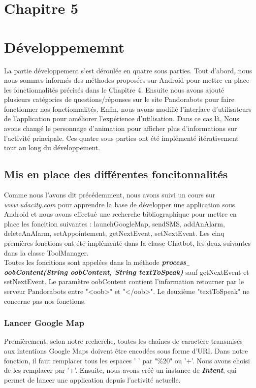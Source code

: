 \section*{Chapitre 5}
\section{Développememnt}
	La partie développement s'est déroulée en quatre sous parties. Tout d'abord, nous nous sommes informés des méthodes proposées sur Android pour mettre en place les fonctionnalités précisés dans le Chapitre 4. Ensuite nous avons ajouté plusieurs catégories de questions/réponses sur le site Pandorabots pour faire fonctionner nos fonctionnalités. Enfin, nous avons modifié l'interface d'utilisateurs de l'application pour améliorer l'expérience d'utilisation. Dans ce cas là, Nous avons changé le personnage d'animation pour afficher plus d'informations sur l'activité principale. Ces quatre sous parties ont été implémenté itérativement tout au long du développement.

\subsection{Mis en place des différentes foncitonnalités}
	
\indent Comme nous l'avons dit précédemment, nous avons suivi un cours sur \emph{www.udacity.com} pour apprendre la base de développer une application sous Android et nous avons effectué une recherche bibliographique pour mettre en place les foncition suivantes : launchGoogleMap, sendSMS, addAnAlarm, deleteAnAlarm, setAppointement, getNextEvent, setNextEvent. Les cinq premières fonctions ont été implémenté dans la classe Chatbot, les deux suivantes dans la classe ToolManager.\\
\indent Toutes les foncitions sont appelées dans la méthode \textbf{\emph{process$_-$oobContent(String oobContent, String textToSpeak)}} sauf getNextEvent et setNextEvent. Le paramètre oobContent contient l'information retourner par le serveur Pandorabots entre "<oob>" et "</oob>". Le deuxième "textToSpeak" ne concerne pas nos fonctions.

\subsubsection{Lancer Google Map}

\indent Premièrement, selon notre recherche, toutes les chaînes de caractère transmises aux intentions Google Maps doivent être encodées sous forme d'URI. Dans notre fonction, il faut remplacer tous les espaces ' ' par "\%20" ou '+'. Nous avons choisi de les remplacer par '+'. Ensuite, nous avons créé un instance de \textbf{\emph{Intent}}, qui permet de lancer une application depuis l'activité actuelle. 

